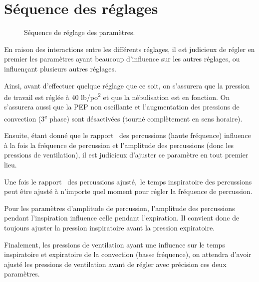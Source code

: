 \section{Séquence des réglages}

\begin{figure*}  \caption{Séquence de réglage
des paramètres.} \end{figure*}

En raison des interactions entre les différents réglages, il est
judicieux de régler en premier les paramètres ayant beaucoup
d'influence sur les autres réglages, ou influençant plusieurs autres
réglages.

Ainsi, avant d'effectuer quelque réglage que ce soit, on s'assurera
que la pression de travail est réglée à 40 lb/po\textsuperscript{2} et
que la nébulisation est en fonction. On s'assurera aussi que la PEP
non oscillante et l'augmentation des pressions de convection
(3\textsuperscript{e} phase) sont désactivées (tourné complètement en
sens horaire).

Ensuite, étant donné que le rapport \ie\ des percussions (haute
fréquence) influence à la fois la fréquence de percussion et
l'amplitude des percussions (donc les pressions de ventilation), il
est judicieux d'ajuster ce paramètre en tout premier lieu.

Une fois le rapport \ie\ des percussions ajusté,~le temps inspiratoire
des percussions peut être ajusté à n'importe quel moment pour régler
la fréquence de percussion.

Pour les paramètres d'amplitude de percussion, l'amplitude des
percussions pendant l'inspiration influence celle pendant
l'expiration.  Il convient donc de toujours ajuster la pression
inspiratoire avant la pression expiratoire.

Finalement, les pressions de ventilation ayant une influence sur le
temps inspiratoire et expiratoire de la convection (basse fréquence),
on attendra d'avoir ajusté les pressions de ventilation avant de
régler avec précision ces deux paramètres.


\restoregeometry
